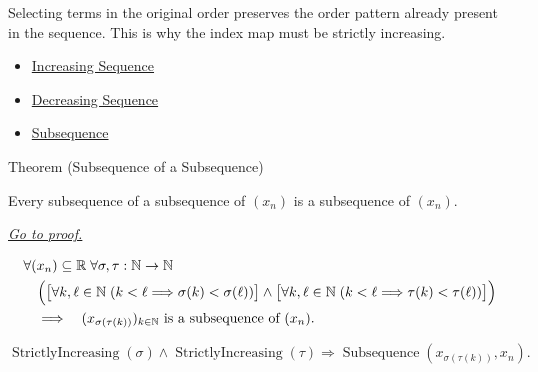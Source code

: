 \begin{remark*}[Interpretation]
Selecting terms in the original order preserves the order pattern already
present in the sequence. This is why the index map must be strictly increasing.
\end{remark*}

\begin{dependencies}
\begin{itemize}
  \item \hyperref[def:increasing-sequence]{Increasing Sequence}
  \item \hyperref[def:decreasing-sequence]{Decreasing Sequence}
  \item \hyperref[def:subsequence]{Subsequence}
\end{itemize}
\end{dependencies}


\begin{theorembox}{Theorem (Subsequence of a Subsequence)}
\begin{theorem}
\label{thm:subsequence-of-subsequence}
Every subsequence of a subsequence of $(x_n)$ is a subsequence of $(x_n)$.

\smallskip
\noindent
\hyperref[prf:subsequence-of-subsequence]{\textit{Go to proof.}}
\end{theorem}
\end{theorembox}

\begin{remark*}
\[
\begin{aligned}
&\forall (x_n)\subseteq\mathbb{R}\;\forall \sigma,\tau:\mathbb{N}\to\mathbb{N}\\
&\quad\Bigl(
  \bigl[\forall k,\ell\in\mathbb{N}\;(k<\ell\Longrightarrow\sigma(k)<\sigma(\ell))\bigr]
  \land
  \bigl[\forall k,\ell\in\mathbb{N}\;(k<\ell\Longrightarrow\tau(k)<\tau(\ell))\bigr]
\Bigr)\\
&\quad\Longrightarrow\quad
(x_{\sigma(\tau(k))})_{k\in\mathbb{N}}\text{ is a subsequence of }(x_n).
\end{aligned}
\]
\end{remark*}

\begin{remark*}
\[
\operatorname{StrictlyIncreasing}(\sigma)
\land
\operatorname{StrictlyIncreasing}(\tau)
\Longrightarrow
\operatorname{Subsequence}(x_{\sigma(\tau(k))},x_n).
\]
\end{remark*}

